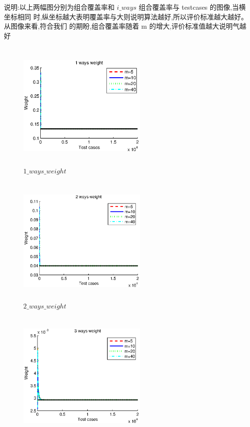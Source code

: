 \documentclass[10pt,journal,letterpaper,compsoc]{IEEEtran}
\begin{document}
\begin{CJK}{UTF8}{gkai}
说明:以上两幅图分别为组合覆盖率和 $i\_ways$ 组合覆盖率与 testcases 的图像,当横坐标相同
时,纵坐标越大表明覆盖率与大则说明算法越好,所以评价标准越大越好。从图像来看,符合我们
的期盼,组合覆盖率随着 m 的增大,评价标准值越大说明气越好
 \begin{figure}[htb]
   \centering
   \includegraphics[width=2.5in,height=2.5in]{./a2_1_picture/1_ways_weight.eps}
   \caption{$1\_ways\_weight$}
   \label{fig:ARCH}
 \end{figure}
 \begin{figure}[htb]
   \centering
   \includegraphics[width=2.5in,height=2.5in]{./a2_1_picture/2_ways_weight.eps}
   \caption{$2\_ways\_weight$}
   \label{fig:ARCH}
 \end{figure}
 \begin{figure}[htb]
   \centering
   \includegraphics[width=2.5in,height=2.5in]{./a2_1_picture/3_ways_weight.eps}

\end{figure}
\end{CJK}
\end{document}
